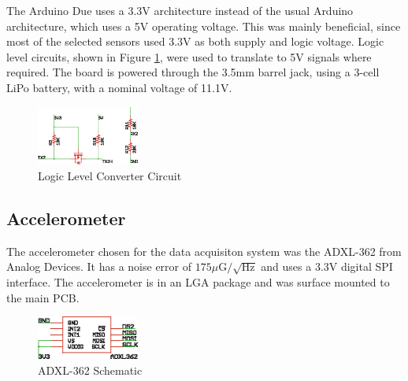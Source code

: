 The Arduino Due uses a 3.3V architecture instead of the usual Arduino architecture, which uses a 5V operating voltage. This was mainly beneficial, since most of the selected sensors used 3.3V as both supply and logic voltage. Logic level circuits, shown in Figure \ref{logicLevel}, were used to translate to 5V signals where required.  The board is powered through the 3.5mm barrel jack, using a 3-cell LiPo battery, with a nominal voltage of 11.1V.
\begin{figure}[H]

  \centering
    \includegraphics[width=0.3\textwidth]{figures/logicLevelConverterSchematic.eps}
      \caption{Logic Level Converter Circuit} \label{logicLevel}
\end{figure}

\subsection*{Accelerometer}
The accelerometer chosen for the data acquisiton system was the ADXL-362 from Analog Devices. It has a noise error of $175\mu\text{G}/\sqrt{\text{Hz}}$ and uses a 3.3V digital SPI interface\cite{adxl362DataSheet}. The accelerometer is in an LGA package and was surface mounted to the main PCB.
\begin{figure}[H]

  \centering
    \includegraphics[width=0.3\textwidth]{figures/adxl362.eps}
      \caption{ADXL-362 Schematic} \label{adxl362Schematic}
\end{figure}

